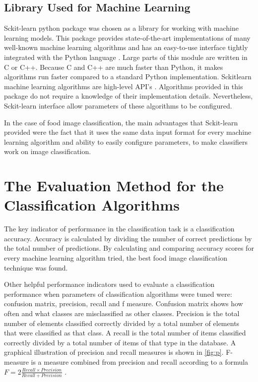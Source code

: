 \subsection{Library Used for Machine Learning }

Sckit-learn python package was chosen as a library for working with machine learning models. This package provides state-of-the-art implementations of many well-known machine learning algorithms and has an easy-to-use interface tightly integrated with the Python language \citep{pedregosa2011scikit}. Large parts of this module are written in C or C++. Because C and C++ are much faster than Python, it makes algorithms run faster compared to a standard Python implementation. Sckit\-learn machine learning algorithms are high-level API's \citep{buitinck2013api}. Algorithms provided in this package do not require a knowledge of their implementation details. Nevertheless, Sckit-learn interface allow parameters of these algorithms to be configured.

In the case of food image classification, the main advantages that Sckit-learn provided were the fact that it uses the same data input format for every machine learning algorithm and ability to easily configure parameters, to make classifiers work on image classification.


\section{The Evaluation Method for the Classification Algorithms}

The key indicator of performance in the classification task is a classification accuracy. Accuracy is calculated by dividing the number of correct predictions by the total number of predictions. By calculating and comparing accuracy scores for every machine learning algorithm tried, the best food image classification technique was found.

Other helpful performance indicators used to evaluate a classification performance when parameters of classification algorithms were tuned were: confusion matrix, precision, recall and f measure. Confusion matrix shows how often and what classes are misclassified as other classes. Precision is the total number of elements classified correctly divided by a total number of elements that were classified as that class. A recall is the total number of items classified correctly divided by a total number of items of that type in the database. A graphical illustration of precision and recall measures is shown in \autoref{fig:p}.  F-measure is a measure combined from precision and recall according to a formula \( F = 2 \frac{Recall \times Precision }{Recall  +  Precision} \)   \citep{ting2011}. 



